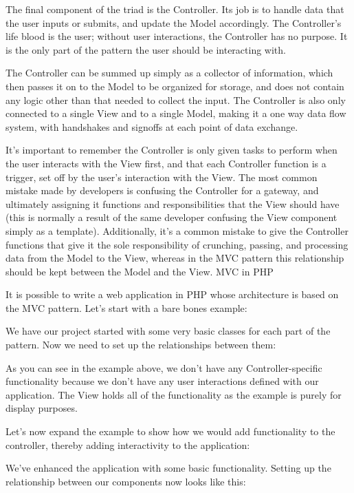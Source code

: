 \documentclass[a4paper,openany,twoside,draft]{book}
\begin{document}
The final component of the triad is the Controller. Its job is to handle data that the user inputs or submits, and update the Model accordingly. The Controller’s life blood is the user; without user interactions, the Controller has no purpose. It is the only part of the pattern the user should be interacting with.

The Controller can be summed up simply as a collector of information, which then passes it on to the Model to be organized for storage, and does not contain any logic other than that needed to collect the input. The Controller is also only connected to a single View and to a single Model, making it a one way data flow system, with handshakes and signoffs at each point of data exchange.

It’s important to remember the Controller is only given tasks to perform when the user interacts with the View first, and that each Controller function is a trigger, set off by the user’s interaction with the View. The most common mistake made by developers is confusing the Controller for a gateway, and ultimately assigning it functions and responsibilities that the View should have (this is normally a result of the same developer confusing the View component simply as a template). Additionally, it’s a common mistake to give the Controller functions that give it the sole responsibility of crunching, passing, and processing data from the Model to the View, whereas in the MVC pattern this relationship should be kept between the Model and the View.
MVC in PHP

It is possible to write a web application in PHP whose architecture is based on the MVC pattern. Let’s start with a bare bones example:


We have our project started with some very basic classes for each part of the pattern. Now we need to set up the relationships between them:


As you can see in the example above, we don’t have any Controller-specific functionality because we don’t have any user interactions defined with our application. The View holds all of the functionality as the example is purely for display purposes.

Let’s now expand the example to show how we would add functionality to the controller, thereby adding interactivity to the application:


We’ve enhanced the application with some basic functionality. Setting up the relationship between our components now looks like this:
\end{document}
